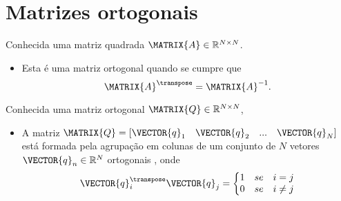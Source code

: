 \section{ Matrizes ortogonais}


\begin{definition}\label{def:ortogonalmatrix0}
Conhecida uma matriz quadrada $\MATRIX{A} \in \mathbb{R}^{N \times N}$. 
\begin{itemize}
\item Esta é uma matriz ortogonal quando se cumpre que \cite[pp. 66]{golub2013matrix}
\begin{equation}
\MATRIX{A}^{\transpose} = \MATRIX{A}^{-1}.
\end{equation}
\end{itemize}
\end{definition}

\begin{theorem}\label{theo:ortogonalmatrix0}
Conhecida uma matriz ortogonal $\MATRIX{Q} \in \mathbb{R}^{N \times N}$,
\begin{itemize}
\item A matriz $\MATRIX{Q}=\left[\VECTOR{q}_1\quad \VECTOR{q}_2\quad ... \quad \VECTOR{q}_N \right]$
está formada pela agrupação em colunas de um conjunto de $N$ vetores $\VECTOR{q}_n \in \mathbb{R}^{N}$
ortogonais \cite[pp. 66]{golub2013matrix}, onde 
\begin{equation}
\VECTOR{q}_i^{\transpose}\VECTOR{q}_j=
\left\{ 
\begin{matrix}
1 & se & i = j\\
0 & se & i \neq j
\end{matrix}
\right.
\end{equation} 
\end{itemize}
\end{theorem}

